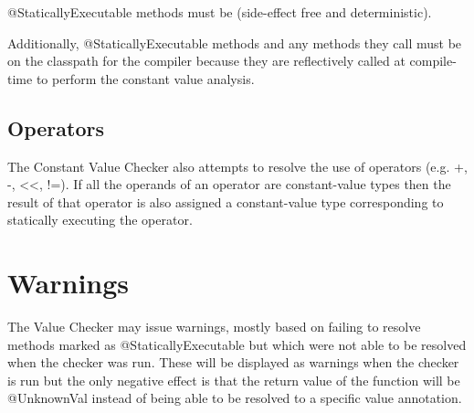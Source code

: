 @StaticallyExecutable methods must
be  (side-effect free and
deterministic).

Additionally, @StaticallyExecutable methods and any methods they call must be on
the classpath for the compiler because they are reflectively called at
compile-time to perform the constant value analysis.

\subsection{Operators}
The Constant Value Checker also attempts to resolve the use of
operators (e.g. +, -, <<, !=). If all the operands of an operator are
constant-value types then the result of that operator is also
assigned a constant-value type corresponding to statically executing
the operator. 

\section{Warnings}
The Value Checker may issue warnings, mostly based on failing to
resolve methods marked as @StaticallyExecutable but which were not able to be
resolved when the checker was run. These will be displayed as warnings when
the checker is run but the only negative effect is that the return
value of the function will be @UnknownVal instead of being able to be
resolved to a specific value annotation.


